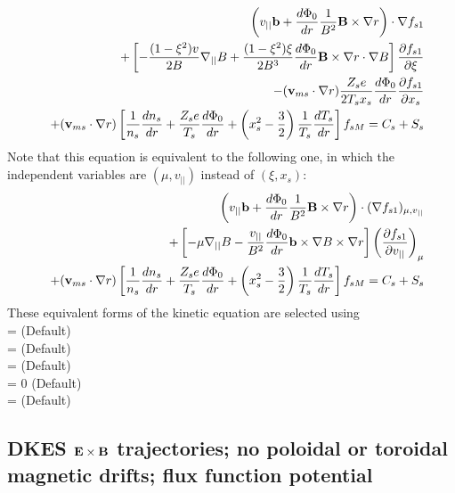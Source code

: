 \begin{eqnarray}
&&\left(v_{||}{\mathbf b} + \frac{d\Phi_0}{dr} \frac{1}{B^2} {\mathbf B}\times\nabla r \right) \cdot \nabla f_{s1} \\
&&+ \left[ - \frac{(1-\xi^2)v}{2B} \nabla_{||} B
+\frac{(1-\xi^2)\xi}{2B^3} \frac{d\Phi_0}{dr}{\mathbf B}\times\nabla r\cdot\nabla B \right]
 \frac{\partial f_{s1}}{\partial \xi} \nonumber \\
&&-({\mathbf v}_{ms} \cdot\nabla r) \frac{Z_s e}{2 T_s x_s} \frac{d\Phi_0}{dr} \frac{\partial f_{s1}}{\partial x_s} \nonumber \\
&&+ ({\mathbf v}_{ms} \cdot \nabla r) \left[ \frac{1}{n_s} \frac{dn_s}{dr} + \frac{Z_s e}{T_s} \frac{d\Phi_0}{dr} + \left(x_s^2-\frac{3}{2}\right) \frac{1}{T_s} \frac{dT_s}{dr}\right] f_{sM}
 = C_s + S_s \nonumber
\end{eqnarray}
Note that this equation is equivalent to the following one, in which the independent variables
are $(\mu,v_{||})$ instead of $(\xi,x_s)$:
\begin{eqnarray}
&&\left(v_{||}{\mathbf b} + \frac{d\Phi_0}{dr} \frac{1}{B^2} {\mathbf B}\times\nabla r \right) \cdot (\nabla f_{s1})_{\mu, v_{||}} \\
&&+ \left[ - \mu \nabla_{||} B
-\frac{v_{||}}{B^2} \frac{d\Phi_0}{dr} {\mathbf b}\times\nabla B \times \nabla r \right]
\left( \frac{\partial f_{s1}}{\partial v_{||}} \right)_{\mu} \nonumber \\
&& + ({\mathbf v}_{ms} \cdot \nabla r) \left[ \frac{1}{n_s} \frac{dn_s}{dr} + \frac{Z_s e}{T_s} \frac{d\Phi_0}{dr} + \left(x_s^2-\frac{3}{2}\right) \frac{1}{T_s} \frac{dT_s}{dr}\right] f_{sM}
=C_s + S_s \nonumber
\end{eqnarray}
These equivalent forms of the kinetic equation are selected using \\
 = \true  \;\;\; (Default) \\
 = \true \;\;\; (Default) \\
 = \false \;\;\; (Default) \\
 = 0 \;\;\; (Default) \\
 = \false \;\;\; (Default) %




\subsection{DKES ${\mathbf E}\times{\mathbf B}$ trajectories; no poloidal or toroidal magnetic drifts; flux function potential}

